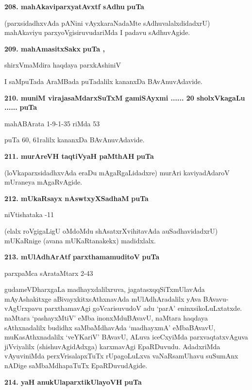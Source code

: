 \medskip
\noindent
\textbf{208. mahAkaviparxyatAvxtf sAdhu} \hfill{\bf puTa \pageref{216}}

\smallskip
(parxsidadhxvAda pANini vAyxkaraNadaMte sAdhuvalalxdidadxrU) mahAkaviyu parxyoVgisiruvudariMda I padavu sAdhuvAgide.

\medskip
\noindent
\textbf{209. mahAmasitxSakx} \hfill{\bf puTa \pageref{81}, \pageref{103}}

\hfill{shirxVmaMdira haqdaya parxkAshiniV}

\smallskip
I saMpuTada AraMBada puTadalilx kananxDa BAvAnuvAdavide.

\medskip
\noindent
\textbf{210. muniM virajasaMdarxSuTxM gamiSAyxmi ...... 20 sholxVkagaLu ......} \hfill{\bf puTa \pageref{58}}

\hfill{mahABArata 1-9-1-35 riMda 53}

\smallskip
puTa 60, 61ralilx kananxDa BAvAnuvAdavide.



\noindent
\textbf{211. murAreVH taqtiVyaH paMthAH} \hfill{\bf puTa \pageref{248}}

\smallskip
(loVkaparxsidadhxvAda eraDu mAgaRgaLidadxre) murAri kaviyadAdaroV mUraneya mAgaRvAgide.

\medskip
\noindent
\textbf{212. mUkaRsayx nAswtxyXSadhaM} \hfill{\bf puTa \pageref{189}}

\hfill{niVtishataka -11}

(elalx roVgigaLigU oMdoMdu shAsatxrXvihitavAda auSadhavidadxrU) mUKaR\-nige (avana mUKaR\-tanakekx) madidxlalx.

\eject

\noindent
\textbf{213. mUlAdhArAtf parxthamamuditoV} \hfill{\bf puTa \pageref{152}}

\hfill{parxpaMca sArataMtarx 2-43}

\smallskip
gudameVDharxgaLa madhayxdalilxruva, jagatasxqqSiTxmUlavAda mAyAshakitxge aBivayxkitx\-sAthxnavAda mUlA\-dhAra\-dalilx yAva BAvavu-vAgUrxpavu parxthamavAgi goVcarisuvudoV adu `parA' eninxsikoLuLxtatxde. naMtara\- `pashayxMtiV' eMba inonxMdu\break BAvavU, naMtara haqdaya sAthxnadalilx budidhx saMbaMdhavAda `madhayxmA' eMba\break BAvavU, muKa\-sAthxnadalilx `veYKariV' BAvavU, ALuva iceCxyiMda parxvaqtatxvAguva jiVviyalilx (shishuvAgidAdxga) karxmavAgi EpaRDuvudu. AdadxriMda vAyu\-viniMda perxVrisalapxTuTx rUpagoLuLxva vaNaR\-samUhavu suSumAnx nADige saMbaMdhapaTuTx EpaRDuvudAgide.

\medskip
\noindent
\textbf{214. yaH anukUlaparxtikUlayoVH} \hfill{\bf puTa \pageref{94}}

